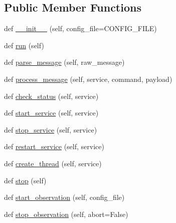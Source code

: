 \subsection*{Public Member Functions}
\begin{DoxyCompactItemize}
\item 
def \mbox{\hyperlink{classdarc_1_1darc__master_1_1_d_a_r_c_master_a795bbbd3a6e7da9ba38dabb30071ccaa}{\+\_\+\+\_\+init\+\_\+\+\_\+}} (self, config\+\_\+file=C\+O\+N\+F\+I\+G\+\_\+\+F\+I\+LE)
\item 
def \mbox{\hyperlink{classdarc_1_1darc__master_1_1_d_a_r_c_master_af3ae1767344d86ac8a6bdaa57790f3eb}{run}} (self)
\item 
def \mbox{\hyperlink{classdarc_1_1darc__master_1_1_d_a_r_c_master_a589349132ce896bd949a20c33be5c015}{parse\+\_\+message}} (self, raw\+\_\+message)
\item 
def \mbox{\hyperlink{classdarc_1_1darc__master_1_1_d_a_r_c_master_a83ba9e207dcb4b9f14c6b8d16b66be62}{process\+\_\+message}} (self, service, command, payload)
\item 
def \mbox{\hyperlink{classdarc_1_1darc__master_1_1_d_a_r_c_master_a771d938b3a1a5d1f9c2e38c7d3041fee}{check\+\_\+status}} (self, service)
\item 
def \mbox{\hyperlink{classdarc_1_1darc__master_1_1_d_a_r_c_master_a0cfd8f4e4fc33e681564c2769bd8e362}{start\+\_\+service}} (self, service)
\item 
def \mbox{\hyperlink{classdarc_1_1darc__master_1_1_d_a_r_c_master_aa908ae91dc2c239806d2c6555f630395}{stop\+\_\+service}} (self, service)
\item 
def \mbox{\hyperlink{classdarc_1_1darc__master_1_1_d_a_r_c_master_ad77bc3ecaa7973c103d09e1a5d465f69}{restart\+\_\+service}} (self, service)
\item 
def \mbox{\hyperlink{classdarc_1_1darc__master_1_1_d_a_r_c_master_abe8e4b875cbac792c18bb4bb2088ca8c}{create\+\_\+thread}} (self, service)
\item 
def \mbox{\hyperlink{classdarc_1_1darc__master_1_1_d_a_r_c_master_ab9838f3edc02ea5baf103b426ba906c3}{stop}} (self)
\item 
def \mbox{\hyperlink{classdarc_1_1darc__master_1_1_d_a_r_c_master_a83109658830d6b9993c1d3a515351ca0}{start\+\_\+observation}} (self, config\+\_\+file)
\item 
def \mbox{\hyperlink{classdarc_1_1darc__master_1_1_d_a_r_c_master_aba7fbc36f7f40f0357019c693c413c0f}{stop\+\_\+observation}} (self, abort=False)
\end{DoxyCompactItemize}
